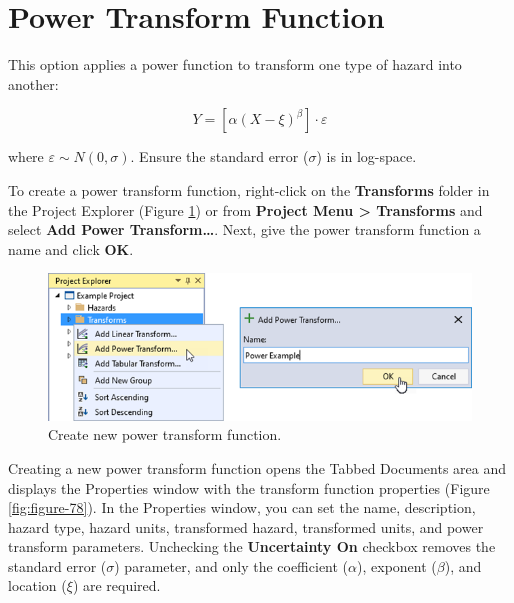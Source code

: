 \documentclass[
]{book}
\begin{document}
\hypertarget{power-transform-function}{%
\section{Power Transform Function}\label{power-transform-function}}

This option applies a power function to transform one type of hazard into another:

\begin{equation}
    Y = \left[ \alpha (X - \xi)^\beta \right] \cdot \varepsilon
    \label{eq:power}
\end{equation}

where \(\varepsilon \sim N(0, \sigma)\). Ensure the standard error (\(\sigma\)) is in log-space.

To create a power transform function, right-click on the \textbf{Transforms} folder in the Project Explorer (Figure \ref{fig:figure-77}) or from \textbf{Project Menu \textgreater{} Transforms} and select \textbf{Add Power Transform\ldots{}}. Next, give the power transform function a name and click \textbf{OK}.

\begin{figure}

{\centering \includegraphics{images/figure77} 

}

\caption{Create new power transform function.}\label{fig:figure-77}
\end{figure}

Creating a new power transform function opens the Tabbed Documents area and displays the Properties window with the transform function properties (Figure \ref{fig:figure-78}). In the Properties window, you can set the name, description, hazard type, hazard units, transformed hazard, transformed units, and power transform parameters. Unchecking the \textbf{Uncertainty On} checkbox removes the standard error (\(\sigma\)) parameter, and only the coefficient (\(\alpha\)), exponent (\(\beta\)), and location (\(\xi\)) are required.
\end{document}
